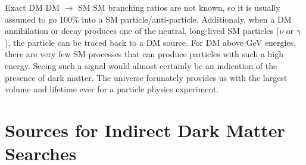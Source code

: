 \begin{figure}[h]
\end{figure}

Exact DM DM $\rightarrow$ SM SM branching ratios are not known, so it is usually assumed to go 100\% into a SM particle/anti-particle.
Additionaly, when a DM annihilation or decay produces one of the neutral, long-lived SM particles ($\nu$ or $\gamma$), the particle can be traced back to a DM source.
For DM above GeV energies, there are very few SM processes that can produce particles with such a high energy.
Seeing such a signal would almost certainly be an indication of the presence of dark matter.
The universe forunately provides us with the largest volume and lifetime ever for a particle physics experiment.

\section{Sources for Indirect Dark Matter Searches\label{sec:dm_targets}}

